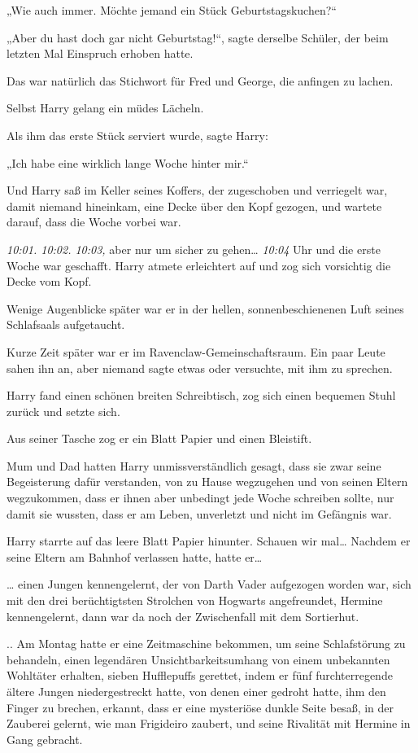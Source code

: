 {„Wie auch immer. Möchte jemand ein Stück Geburtstagskuchen?“

„Aber du hast doch gar nicht Geburtstag!“, sagte derselbe Schüler, der beim letzten Mal Einspruch erhoben hatte.

Das war natürlich das Stichwort für Fred und George, die anfingen zu lachen.

Selbst Harry gelang ein müdes Lächeln.

Als ihm das erste Stück serviert wurde, sagte Harry:

„Ich habe eine wirklich lange Woche hinter mir.“

Und Harry saß im Keller seines Koffers, der zugeschoben und verriegelt war, damit niemand hineinkam, eine Decke über den Kopf gezogen, und wartete darauf, dass die Woche vorbei war.

\emph{10:01. 10:02. 10:03,} aber nur um sicher zu gehen… \emph{10:04} Uhr und die erste Woche war geschafft. Harry atmete erleichtert auf und zog sich vorsichtig die Decke vom Kopf.

Wenige Augenblicke später war er in der hellen, sonnenbeschienenen Luft seines Schlafsaals aufgetaucht.

Kurze Zeit später war er im Ravenclaw-Gemeinschaftsraum. Ein paar Leute sahen ihn an, aber niemand sagte etwas oder versuchte, mit ihm zu sprechen.

Harry fand einen schönen breiten Schreibtisch, zog sich einen bequemen Stuhl zurück und setzte sich.

Aus seiner Tasche zog er ein Blatt Papier und einen Bleistift.

Mum und Dad hatten Harry unmissverständlich gesagt, dass sie zwar seine Begeisterung dafür verstanden, von zu Hause wegzugehen und von seinen Eltern wegzukommen, dass er ihnen aber unbedingt jede Woche schreiben sollte, nur damit sie wussten, dass er am Leben, unverletzt und nicht im Gefängnis war.

Harry starrte auf das leere Blatt Papier hinunter. Schauen wir mal… Nachdem er seine Eltern am Bahnhof verlassen hatte, hatte er…

… einen Jungen kennengelernt, der von Darth Vader aufgezogen worden war, sich mit den drei berüchtigtsten Strolchen von Hogwarts angefreundet, Hermine kennengelernt, dann war da noch der Zwischenfall mit dem Sortierhut.

.. Am Montag hatte er eine Zeitmaschine bekommen, um seine Schlafstörung zu behandeln, einen legendären Unsichtbarkeitsumhang von einem unbekannten Wohltäter erhalten, sieben Hufflepuffs gerettet, indem er fünf furchterregende ältere Jungen niedergestreckt hatte, von denen einer gedroht hatte, ihm den Finger zu brechen, erkannt, dass er eine mysteriöse dunkle Seite besaß, in der Zauberei gelernt, wie man Frigideiro zaubert, und seine Rivalität mit Hermine in Gang gebracht.

}
